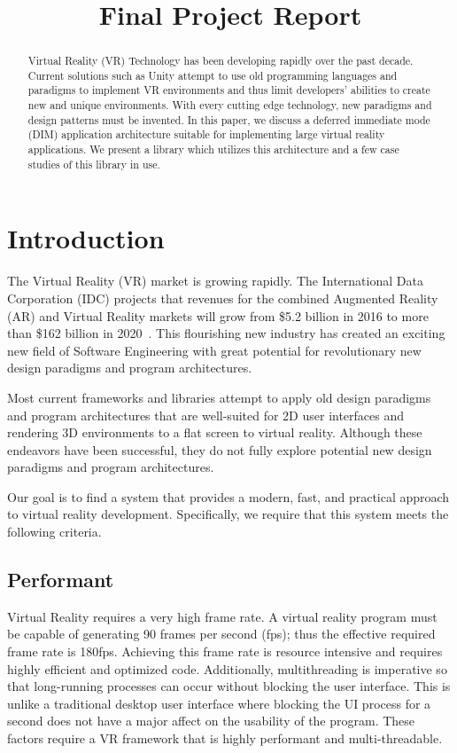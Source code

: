 \documentclass[conference,12pt]{IEEEtran}
\title{Final Project Report}
\author{%
    \IEEEauthorblockN{%
        Jonathan Sumner Evans\IEEEauthorrefmark{1},
        Robinson Merillat\IEEEauthorrefmark{2}, and
        Sam Sartor\IEEEauthorrefmark{3}
    }
    \IEEEauthorblockA{%
        Department of Computer Science,
        Colorado School of Mines\\
        Golden, Colorado\\
        Email:
            \IEEEauthorrefmark{1}jonathanevans@mines.edu,
            \IEEEauthorrefmark{2}rdmerillat@mines.edu,
            \IEEEauthorrefmark{3}ssartor@mines.edu
    }
}
\begin{document}
\maketitle

\begin{abstract}
    Virtual Reality (VR) Technology has been developing rapidly over the past
    decade. Current solutions such as Unity attempt to use old programming
    languages and paradigms to implement VR environments and thus limit
    developers' abilities to create new and unique environments. With every
    cutting edge technology, new paradigms and design patterns must be invented.
    In this paper, we discuss a deferred immediate mode (DIM) application
    architecture suitable for implementing large virtual reality applications.
    We present a library which utilizes this architecture and a few case studies
    of this library in use.
\end{abstract}

\section{Introduction}
The Virtual Reality (VR) market is growing rapidly. The International Data
Corporation (IDC) projects that revenues for the combined Augmented Reality (AR)
and Virtual Reality markets will grow from \$5.2 billion in 2016 to more than
\$162 billion in 2020~\cite{IDC:2016:VR-industry}. This flourishing new industry
has created an exciting new field of Software Engineering with great potential
for revolutionary new design paradigms and program architectures.

Most current frameworks and libraries attempt to apply old design paradigms and
program architectures that are well-suited for 2D user interfaces and rendering
3D environments to a flat screen to virtual reality. Although these endeavors
have been successful, they do not fully explore potential new design paradigms
and program architectures.

Our goal is to find a system that provides a modern, fast, and practical
approach to virtual reality development. Specifically, we require that this
system meets the following criteria.

\subsection{Performant}
Virtual Reality requires a very high frame rate. A virtual reality program must
be capable of generating 90 frames per second (fps); thus the effective required
frame rate is 180fps.  Achieving this frame rate is resource intensive and
requires highly efficient and optimized code. Additionally, multithreading is
imperative so that long-running processes can occur without blocking the user
interface. This is unlike a traditional desktop user interface where blocking
the UI process for a second does not have a major affect on the usability of the
program. These factors require a VR framework that is highly performant and
multi-threadable.
\end{document}

